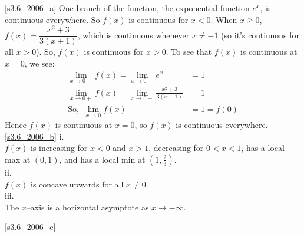 \begin{answer}
\eqref{s3.6_2006_a}
One branch of the function,
the exponential function $e^x$, is continuous everywhere. So $f(x)$ is continuous for $x<0$. When $x \geq 0$, $f(x)=\dfrac{x^2+3}{3(x+1)}$, which is continuous whenever $x \neq -1$ (so it's continuous for all $x >0$). So, $f(x)$ is continuous for $x>0$. To see that $f(x)$ is continuous at $x=0$, we see:
\begin{align*}
\lim_{x\rightarrow0-}f(x)=\lim_{x\rightarrow0-}e^x&=1\\
\lim_{x\rightarrow0+}f(x)=\lim_{x\rightarrow0+}\frac{x^2+3}{3(x+1)}&=1\\
\mbox{So, }~\lim_{x \rightarrow 0}f(x)&=1=f(0)
\end{align*}
Hence $f(x)$ is continuous at $x=0$, so $f(x)$ is continuous everywhere.\\
\eqref{s3.6_2006_b}
i.\\  $f(x)$ is increasing for $x<0$ and $x>1$, decreasing for $0<x<1$,
            has a local max at $(0,1)$, and has a local min at $\left(1,\frac{2}{3}\right)$.\\
ii.\\ $f(x)$ is concave upwards for all $x\ne 0$.\\
iii.\\ The $x$--axis is a horizontal asymptote as $x\rightarrow-\infty$.

\eqref{s3.6_2006_c}
\begin{center}\end{center}
\end{answer}
